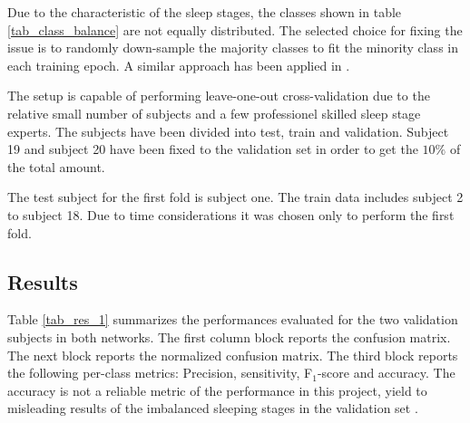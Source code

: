 Due to the characteristic of the sleep stages, the classes shown in table \ref{tab_class_balance} are not equally distributed. The selected choice for fixing the issue is to randomly down-sample the majority classes to fit the minority class in each training epoch. A similar approach has been applied in \cite{main_ar}. 

The setup is capable of performing leave-one-out cross-validation due to the relative small number of subjects and a few professionel skilled sleep stage experts.
The subjects have been divided into test, train and validation. Subject 19 and subject 20 have been fixed to the validation set in order to get the $10\%$ of the total amount. 

The test subject for the first fold is subject one. The train data includes subject 2 to subject 18. Due to time considerations it was chosen only to perform the first fold.

\subsection{Results}
\label{subsec:results}

Table \ref{tab_res_1} summarizes the performances evaluated for the two validation subjects in both networks. 
The first column block reports the confusion matrix. The next block reports the normalized confusion matrix. The third block reports the following per-class metrics: Precision, sensitivity, F$_1$-score and accuracy. The accuracy is not a reliable metric of the performance in this project, yield to misleading results of the imbalanced sleeping stages in the validation set \cite[sec. 11]{dl_book}.

